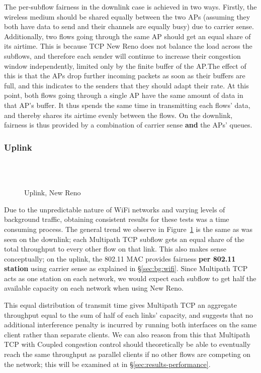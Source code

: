 The per-subflow fairness in the downlink case is achieved in two ways. Firstly,
the wireless medium should be shared equally between the two APs (assuming they
both have data to send and their channels are equally busy) due to carrier
sense. Additionally, two flows going through the same AP should get an equal share of 
its airtime. This is because TCP New Reno does not balance the load across the subflows, and therefore each sender will continue to increase their congestion window independently, limited only by the finite buffer of the AP.\@ The effect of this is that the APs drop further incoming packets as soon as their buffers are full, and this indicates to the senders that they should adapt their rate. At this point, both flows going through a single AP have the same amount of data in that AP's buffer. It thus spends the same time in transmitting each flows' data, and thereby shares its airtime evenly between the flows. On the downlink, fairness is thus provided by a combination of carrier sense \textbf{and} the APs' queues.

\subsubsection{Uplink}
\label{sec:results-mptcp-up}

\begin{figure}[h]
  \centering
  \\
  \subfloat[][2.4 GHz, non-overlapping channels] {\
    \scalebox{0.70}{}\label{graph:cc-reno-up}
  }
  \\
  \subfloat[][5 and 2.4 GHz] {\
    \scalebox{0.70}{}\label{graph:cb-reno-up}
  }
  \caption{Uplink, New Reno}\label{graph:reno-up}
\end{figure}

Due to the unpredictable nature of WiFi networks and varying levels of background
traffic, obtaining consistent results for these tests was a time consuming
process. The general trend we observe in Figure~\ref{graph:reno-up} is the
same as was seen on the downlink; each Multipath TCP subflow gets an equal
share of the total throughput to every other flow on that link. This also makes
sense conceptually; on the uplink, the 802.11 MAC provides fairness
\textbf{per 802.11 station} using carrier sense as explained in
\S\ref{sec:bg:wifi}.
Since Multipath TCP acts as one station on each network,
we would expect each subflow to get half the available capacity on each network
when using New Reno.

This equal distribution of transmit time gives Multipath TCP an aggregate throughput equal
to the sum of half of each links' capacity, and suggests that no additional interference
penalty is incurred by running both interfaces on the same client rather than
separate clients. We can also reason from this that Multipath TCP with Coupled
congestion control should theoretically be able to eventually reach the same
throughput as parallel clients if no other flows are competing on the network; 
this will be examined at in \S\ref{sec:results-performance}.

